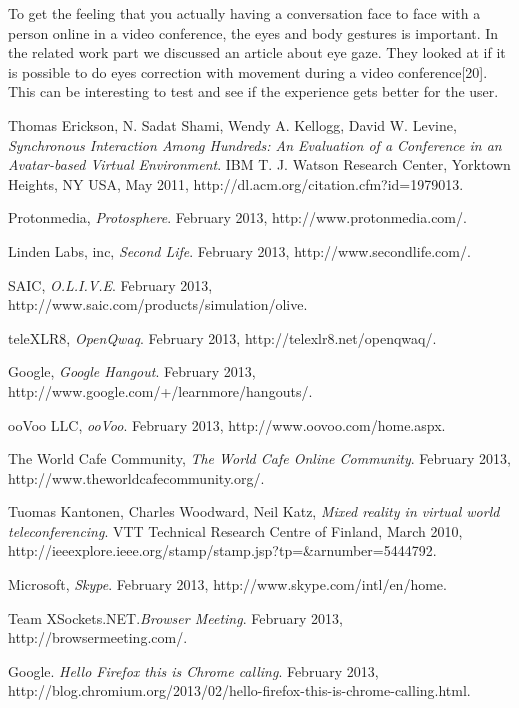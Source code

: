 \documentclass[12pt, titlepage]{article}
\begin{document}
To get the feeling that you actually having a conversation face to face with a person online in a video conference, the eyes and body gestures is important. In the related work part we discussed an article about eye gaze. They looked at if it is possible to do eyes correction with movement during a video conference[20]. This can be interesting to test and see if the experience gets better for the user.
\begin{thebibliography}{9}

  Thomas Erickson, N. Sadat Shami, Wendy A. Kellogg, David W. Levine,
  \emph{Synchronous Interaction Among Hundreds: An Evaluation of a Conference in an Avatar-based Virtual Environment}.
 IBM T. J. Watson Research Center, Yorktown Heights, NY USA,
  May 2011,
  http://dl.acm.org/citation.cfm?id=1979013.


  Protonmedia,
  \emph{Protosphere}.
  February 2013,
  http://www.protonmedia.com/.

  Linden Labs, inc,
  \emph{Second Life}.
  February 2013,
  http://www.secondlife.com/.

  SAIC,
  \emph{O.L.I.V.E}.
  February 2013,
  http://www.saic.com/products/simulation/olive.

  teleXLR8,
  \emph{OpenQwaq}.
  February 2013,
  http://telexlr8.net/openqwaq/.
  
  Google,
  \emph{Google Hangout}.
  February 2013,
  http://www.google.com/+/learnmore/hangouts/.
  
  ooVoo LLC,
  \emph{ooVoo}.
  February 2013,
  http://www.oovoo.com/home.aspx.
  
  The World Cafe Community,
  \emph{The World Cafe Online Community}.
  February 2013,
  http://www.theworldcafecommunity.org/. 

  Tuomas Kantonen, Charles Woodward, Neil Katz,
  \emph{Mixed reality in virtual world teleconferencing}.
  VTT Technical Research Centre of Finland,
  March 2010,
  http://ieeexplore.ieee.org/stamp/stamp.jsp?tp=\&arnumber=5444792.

  Microsoft,
  \emph{Skype}.
  February 2013,
  http://www.skype.com/intl/en/home. 
 
Team XSockets.NET.\emph{Browser Meeting}. February 2013, http://browsermeeting.com/.
  
Google. 
\emph{Hello Firefox this is Chrome calling}.
 February 2013, http://blog.chromium.org/2013/02/hello-firefox-this-is-chrome-calling.html.


\end{thebibliography}
\end{document}
